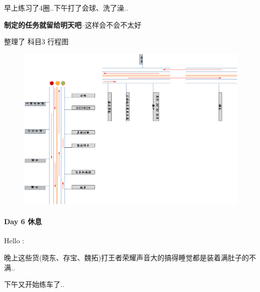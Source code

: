 \documentclass[UTF8,a4paper,8pt]{ctexart}
\begin{document}
	 	 早上练习了4圈..下午打了会球、洗了澡..
	 	 
	 	 \textbf{制定的任务就留给明天吧}--这样会不会不太好
	 	 
	 	 整理了 科目3 行程图
		 	 \begin{figure}[h]
		 	 	\centering
		 	 	\includegraphics[scale = 0.4]{license3.png}
		 	 \end{figure}
	 	
 	 \paragraph{Day 6  休息     \quad     }Hello :
 	 
	 	 晚上这些货(晓东、存宝、魏拓)打王者荣耀声音大的搞得睡觉都是装着满肚子的不满..
 	 
	 	 下午又开始练车了..
 	 
\end{document}
